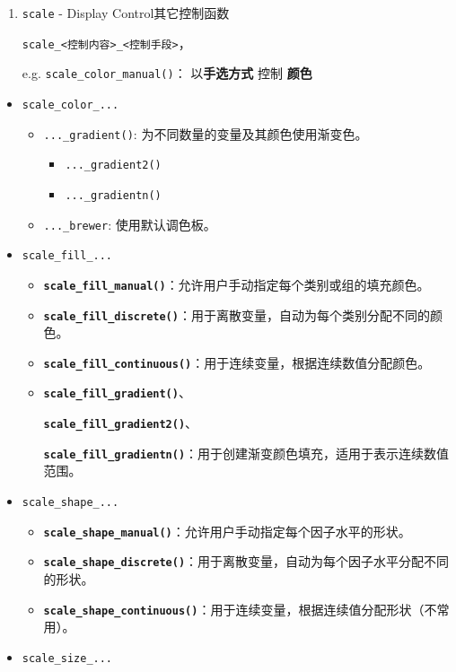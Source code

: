 \documentclass[
]{article}
\begin{document}
\begin{enumerate}
\def\labelenumi{\arabic{enumi}.}
\item
  \texttt{scale} - Display Control其它控制函数

  \texttt{scale\_\textless{}控制内容\textgreater{}\_\textless{}控制手段\textgreater{}}，

  e.g. \texttt{scale\_color\_manual()}： 以\textbf{手选方式} 控制
  \textbf{颜色}
\end{enumerate}

\begin{itemize}
\item
  \texttt{scale\_color\_...}

  \begin{itemize}
  \item
    \texttt{...\_gradient()}: 为不同数量的变量及其颜色使用渐变色。

    \begin{itemize}
    \item
      \texttt{...\_gradient2()}
    \item
      \texttt{...\_gradientn()}
    \end{itemize}
  \item
    \texttt{...\_brewer}: 使用默认调色板。
  \end{itemize}
\item
  \texttt{scale\_fill\_...}

  \begin{itemize}
  \item
    \textbf{\texttt{scale\_fill\_manual()}}：允许用户手动指定每个类别或组的填充颜色。
  \item
    \textbf{\texttt{scale\_fill\_discrete()}}：用于离散变量，自动为每个类别分配不同的颜色。
  \item
    \textbf{\texttt{scale\_fill\_continuous()}}：用于连续变量，根据连续数值分配颜色。
  \item
    \textbf{\texttt{scale\_fill\_gradient()}}、

    \textbf{\texttt{scale\_fill\_gradient2()}}、

    \textbf{\texttt{scale\_fill\_gradientn()}}：用于创建渐变颜色填充，适用于表示连续数值范围。
  \end{itemize}
\item
  \texttt{scale\_shape\_...}

  \begin{itemize}
  \item
    \textbf{\texttt{scale\_shape\_manual()}}：允许用户手动指定每个因子水平的形状。
  \item
    \textbf{\texttt{scale\_shape\_discrete()}}：用于离散变量，自动为每个因子水平分配不同的形状。
  \item
    \textbf{\texttt{scale\_shape\_continuous()}}：用于连续变量，根据连续值分配形状（不常用）。
  \end{itemize}
\item
  \texttt{scale\_size\_...}
\end{itemize}
\end{document}

